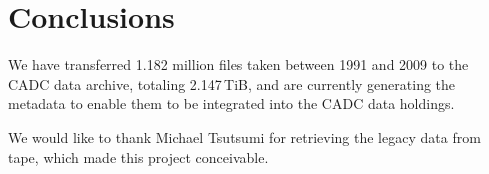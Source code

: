 \documentclass[11pt,twoside]{article}
\begin{document}
\section{Conclusions}

We have transferred 1.182 million files taken between 1991 and 2009 to
the CADC data archive, totaling 2.147\,TiB, and are currently generating
the metadata to enable them to be integrated into the CADC data
holdings.

\acknowledgements We would like to thank
Michael Tsutsumi for
retrieving the legacy data from tape,
which made this project conceivable.


\end{document}
